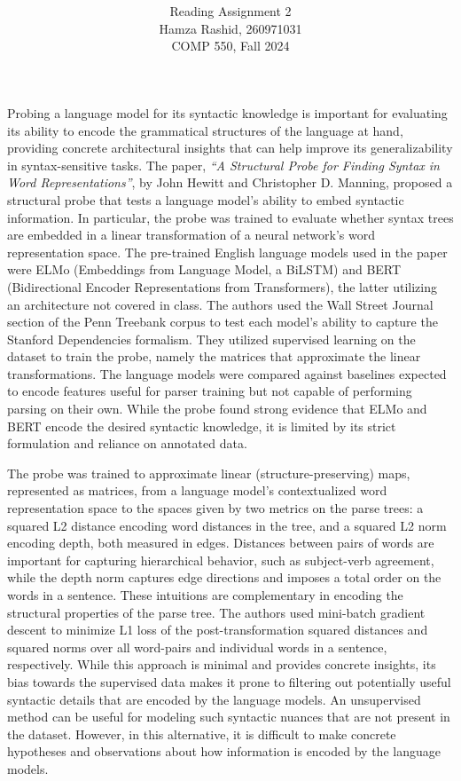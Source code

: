 \documentclass[11pt]{article}
\title{ }
\author{ Reading Assignment 2 \\ Hamza Rashid, 260971031 \\ COMP 550, Fall 2024}
\date{}
\begin{document}
\maketitle

\vspace{-5ex}
Probing a language model for its syntactic knowledge is important
for evaluating its ability to encode the grammatical structures of
the language at hand, providing concrete architectural insights 
that can help improve its generalizability in syntax-sensitive tasks.
The paper, \textit{``A Structural Probe for Finding 
Syntax in Word Representations''}, by John Hewitt and Christopher D. Manning,
proposed a structural probe that tests a
language model's ability to embed syntactic information. 
In particular,
the probe was trained to evaluate whether syntax trees are 
embedded in a linear transformation of a 
neural network’s word representation space.
The pre-trained English language models used in the paper were 
ELMo (Embeddings from Language Model, a BiLSTM) 
and BERT (Bidirectional Encoder Representations from Transformers), 
the latter utilizing an architecture not covered in class. 
The authors used 
the Wall Street Journal section of the 
Penn Treebank corpus to test each model's ability to capture
the Stanford Dependencies formalism. 
They utilized supervised learning on the dataset
to train the probe, namely the matrices that 
approximate the linear transformations.
The language models were compared against baselines 
expected to encode features useful for parser training 
but not capable of performing parsing on their own. 
While the probe found strong evidence
that ELMo and BERT encode the desired syntactic knowledge, 
it is limited by its strict formulation and reliance on annotated data.

The probe was trained to approximate
linear (structure-preserving) maps, represented as matrices,
from a language model's contextualized word representation space to 
the spaces given by two metrics on the parse trees: 
a squared L2 distance encoding 
word distances in the tree, and
a squared L2 norm encoding depth, 
both measured in edges. Distances between pairs of words
are important for capturing hierarchical behavior, such as subject-verb agreement,
while the depth norm captures edge directions and imposes a total order 
on the words in a sentence. These intuitions are complementary 
in encoding the structural properties of the parse tree.
The authors used mini-batch gradient descent 
to minimize L1 loss of the post-transformation squared distances and squared norms
over all word-pairs and individual words in a sentence, respectively.
While this approach is minimal and provides concrete insights,
its bias towards the supervised data makes it prone to filtering
out potentially useful syntactic details that are
encoded by the language models.
An unsupervised method can be useful for modeling such syntactic nuances
that are not present in the dataset. However, in this alternative,
it is difficult to make concrete hypotheses and observations about how
information is encoded by the language models. 
\end{document}
